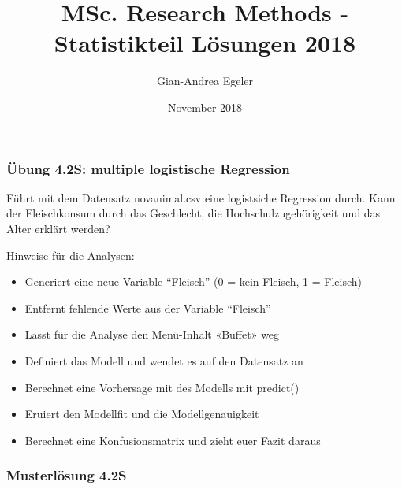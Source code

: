 \documentclass[]{article}
\title{MSc. Research Methods - Statistikteil Lösungen 2018}
\author{Gian-Andrea Egeler}
\date{November 2018}
\newenvironment{Shaded}{\begin{snugshade}}{\end{snugshade}}
\newcommand{\KeywordTok}[1]{\textcolor[rgb]{0.13,0.29,0.53}{\textbf{#1}}}
\newcommand{\DecValTok}[1]{\textcolor[rgb]{0.00,0.00,0.81}{#1}}
\newcommand{\StringTok}[1]{\textcolor[rgb]{0.31,0.60,0.02}{#1}}
\newcommand{\CommentTok}[1]{\textcolor[rgb]{0.56,0.35,0.01}{\textit{#1}}}
\newcommand{\OperatorTok}[1]{\textcolor[rgb]{0.81,0.36,0.00}{\textbf{#1}}}
\newcommand{\NormalTok}[1]{#1}
\providecommand{\tightlist}{%
  \setlength{\itemsep}{0pt}\setlength{\parskip}{0pt}}
\begin{document}
\maketitle

\subsubsection{Übung 4.2S: multiple logistische
Regression}\label{ubung-4.2s-multiple-logistische-regression}

Führt mit dem Datensatz novanimal.csv eine logistsiche Regression durch.
Kann der Fleischkonsum durch das Geschlecht, die Hochschulzugehörigkeit
und das Alter erklärt werden?

Hinweise für die Analysen:

\begin{itemize}
\tightlist
\item
  Generiert eine neue Variable ``Fleisch'' (0 = kein Fleisch, 1 =
  Fleisch)
\item
  Entfernt fehlende Werte aus der Variable ``Fleisch''
\item
  Lasst für die Analyse den Menü-Inhalt «Buffet» weg
\item
  Definiert das Modell und wendet es auf den Datensatz an
\item
  Berechnet eine Vorhersage mit des Modells mit predict()
\item
  Eruiert den Modellfit und die Modellgenauigkeit
\item
  Berechnet eine Konfusionsmatrix und zieht euer Fazit daraus
\end{itemize}

\subsubsection{Musterlösung 4.2S}\label{musterlosung-4.2s}

\begin{Shaded}
\end{Shaded}
\end{document}
